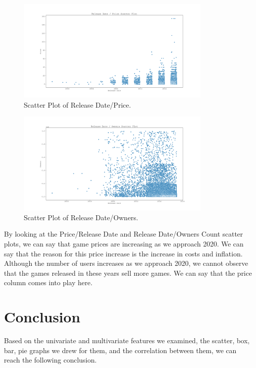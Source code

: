 \documentclass[conference]{IEEEtran}
\begin{document}
\begin{figure}[h]
  \includegraphics[width=\linewidth, height=5cm]{assets-2/release_date_price_scatter.png}
  \caption{Scatter Plot of Release Date/Price.}
  \label{fig:release_date_price1}
\end{figure}
\FloatBarrier

\begin{figure}[h]
  \includegraphics[width=\linewidth, height=5cm]{assets-2/release_date_owners_scatter.png}
  \caption{Scatter Plot of Release Date/Owners.}
  \label{fig:release_date_owners1}
\end{figure}
\FloatBarrier

By looking at the Price/Release Date and Release Date/Owners Count scatter plots, we can say that game prices are increasing as we approach 2020. We can say that the reason for this price increase is the increase in costs and inflation. Although the number of users increases as we approach 2020, we cannot observe that the games released in these years sell more games. We can say that the price column comes into play here.

\section{Conclusion}

Based on the univariate and multivariate features we examined, the scatter, box, bar, pie graphs we drew for them, and the correlation between them, we can reach the following conclusion.
\end{document}
